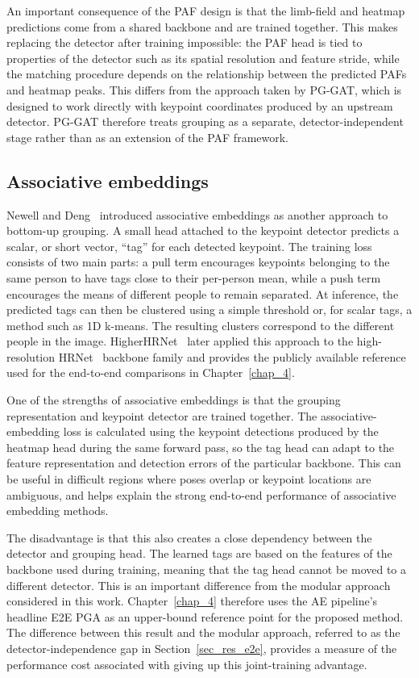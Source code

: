 An important consequence of the PAF design is that the limb-field and heatmap predictions
come from a shared backbone and are trained together.
This makes replacing the detector after training impossible:
the PAF head is tied to properties of the detector such as its spatial resolution and feature stride,
while the matching procedure depends on the relationship between the predicted PAFs and heatmap peaks.
This differs from the approach taken by PG-GAT,
which is designed to work directly with keypoint coordinates produced by an upstream detector.
PG-GAT therefore treats grouping as a separate, detector-independent stage
rather than as an extension of the PAF framework.

\subsection{Associative embeddings}
\label{sec_lit_grouping_ae}

Newell and Deng~\cite{newell2017associative} introduced associative embeddings
as another approach to bottom-up grouping.
A small head attached to the keypoint detector predicts a scalar, or short vector, ``tag'' for each detected keypoint.
The training loss consists of two main parts:
a pull term encourages keypoints belonging to the same person to have tags close to their per-person mean,
while a push term encourages the means of different people to remain separated.
At inference, the predicted tags can then be clustered using a simple threshold
or, for scalar tags, a method such as 1D k-means.
The resulting clusters correspond to the different people in the image.
HigherHRNet~\cite{cheng2020higherhrnet} later applied this approach
to the high-resolution HRNet~\cite{sun2019hrnet} backbone family
and provides the publicly available reference used for the end-to-end comparisons in Chapter~\ref{chap_4}.

One of the strengths of associative embeddings
is that the grouping representation and keypoint detector are trained together.
The associative-embedding loss is calculated
using the keypoint detections produced by the heatmap head during the same forward pass,
so the tag head can adapt to the feature representation and detection errors of the particular backbone.
This can be useful in difficult regions where poses overlap or keypoint locations are ambiguous,
and helps explain the strong end-to-end performance of associative embedding methods.

The disadvantage is that this also creates a close dependency between the detector and grouping head.
The learned tags are based on the features of the backbone used during training,
meaning that the tag head cannot be moved to a different detector.
This is an important difference from the modular approach considered in this work.
Chapter~\ref{chap_4} therefore uses the AE pipeline's headline E2E PGA
as an upper-bound reference point for the proposed method.
The difference between this result and the modular approach,
referred to as the detector-independence gap in Section~\ref{sec_res_e2e},
provides a measure of the performance cost associated with giving up this joint-training advantage.

